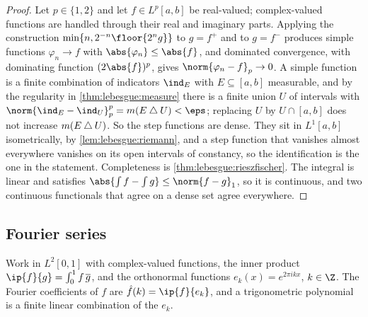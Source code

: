 \begin{refsection}
\begin{proof}
Let $p\in\{1,2\}$ and let $f\in L^p[a,b]$ be real-valued; complex-valued functions are handled through their real and imaginary parts. Applying the construction $\min\{n,2^{-n}\floor{2^ng}\}$ to $g=f^+$ and to $g=f^-$ produces simple functions $\varphi_n\to f$ with $\abs{\varphi_n}\le\abs{f}$, and dominated convergence, with dominating function $(2\abs{f})^p$, gives $\norm{\varphi_n-f}_p\to0$. A simple function is a finite combination of indicators $\ind_E$ with $E\subseteq[a,b]$ measurable, and by the regularity in \cref{thm:lebesgue:measure} there is a finite union $U$ of intervals with $\norm{\ind_E-\ind_U}_p^p=m(E\lebsymdiff U)<\eps$; replacing $U$ by $U\cap[a,b]$ does not increase $m(E\mathbin{\triangle} U)$. So the step functions are dense. They sit in $L^1[a,b]$ isometrically, by \cref{lem:lebesgue:riemann}, and a step function that vanishes almost everywhere vanishes on its open intervals of constancy, so the identification is the one in the statement. Completeness is \cref{thm:lebesgue:rieszfischer}. The integral is linear and satisfies $\abs{\int f-\int g}\le\norm{f-g}_1$, so it is continuous, and two continuous functionals that agree on a dense set agree everywhere.
\end{proof}


\subsection{Fourier series}\label{sec:lebesgue:fourier}

Work in $L^2[0,1]$ with complex-valued functions, the inner product $\ip{f}{g}=\int_0^1f\,\overline{g}$, and the orthonormal functions $e_k(x)=e^{2\pi ikx}$, $k\in\Z$. The Fourier coefficients of $f$ are $\hat f(k)=\ip{f}{e_k}$, and a trigonometric polynomial is a finite linear combination of the $e_k$.


\end{refsection}
